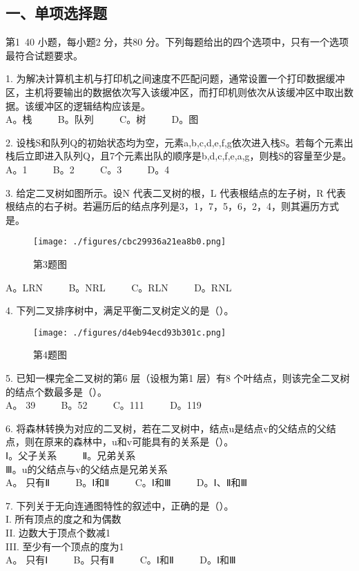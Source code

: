 
\subsection{一、单项选择题}
第1~40 小题，每小题2 分，共80 分。下列每题给出的四个选项中，只有一个选项最符合试题要求。

1. 为解决计算机主机与打印机之间速度不匹配问题，通常设置一个打印数据缓冲区，主机将要输出的数据依次写入该缓冲区，而打印机则依次从该缓冲区中取出数据。该缓冲区的逻辑结构应该是。 \\
A。栈 $\qquad$ B。队列 $\qquad$ C。树 $\qquad$ D。图

2. 设栈S和队列Q的初始状态均为空，元素a,b,c,d,e,f,g依次进入栈S。若每个元素出栈后立即进入队列Q，且7个元素出队的顺序是b,d,c,f,e,a,g，则栈S的容量至少是。 \\
A。1 $\qquad$ B。2 $\qquad$ C。3 $\qquad$ D。4

3. 给定二叉树如图所示。设N 代表二叉树的根，L 代表根结点的左子树，R 代表根结点的右子树。若遍历后的结点序列是3，1，7，5，6，2，4，则其遍历方式是。 \\
\begin{figure}[ht]
\centering
\texttt{[image: ./figures/cbc29936a21ea8b0.png]}
\caption{第3题图} \label{fig_CSN09_1}
\end{figure}
A。LRN $\qquad$ B。NRL $\qquad$ C。RLN $\qquad$ D。RNL

4. 下列二叉排序树中，满足平衡二叉树定义的是（）。\\
\begin{figure}[ht]
\centering
\texttt{[image: ./figures/d4eb94ecd93b301c.png]}
\caption{第4题图} \label{fig_CSN09_2}
\end{figure}

5. 已知一棵完全二叉树的第6 层（设根为第1 层）有8 个叶结点，则该完全二叉树的结点个数最多是（）。 \\
A。 39 $\qquad$ B。52 $\qquad$ C。111 $\qquad$ D。119

6. 将森林转换为对应的二叉树，若在二叉树中，结点u是结点v的父结点的父结点，则在原来的森林中，u和v可能具有的关系是（）。 \\
Ⅰ。父子关系 $\qquad$ Ⅱ。兄弟关系 \\
Ⅲ。u的父结点与v的父结点是兄弟关系 \\
A。 只有Ⅱ $\qquad$ B。Ⅰ和Ⅱ $\qquad$ C。Ⅰ和Ⅲ $\qquad$ D。Ⅰ、Ⅱ和Ⅲ

7. 下列关于无向连通图特性的叙述中，正确的是（）。 \\
I. 所有顶点的度之和为偶数 \\
II. 边数大于顶点个数减1 \\
III. 至少有一个顶点的度为1 \\
A。 只有Ⅰ $\qquad$ B。只有Ⅱ $\qquad$ C。Ⅰ和Ⅱ $\qquad$ D。Ⅰ和Ⅲ

